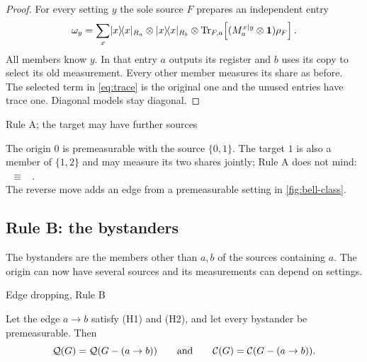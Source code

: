 \begin{proof}
For every setting $y$ the sole source $F$ prepares an independent entry
\[
 \omega_y=\sum_x\lvert x\rangle\!\langle x\rvert_{R_a}\otimes\lvert x\rangle\!\langle x\rvert_{R_b}\otimes
          \operatorname{Tr}_{F,a}\!\left[(M_a^{x\mid y}\otimes\mathbf{1})\rho_F\right].
\]
All members know $y$. In that entry $a$ outputs its register and $b$ uses its copy to select its
old measurement. Every other member measures its share as before. The selected term in \cref{eq:trace}
is the original one and the unused entries have trace one. Diagonal models stay diagonal.
\end{proof}

\begin{validbox}[label=ex:target-two]{Rule A; the target may have further sources}
\begin{minipage}{0.55\linewidth}
The origin $0$ is premeasurable with the source $\{0,1\}$. The target $1$ is also a member of $\{1,2\}$ and may
measure its two shares jointly; Rule A does not mind:\\[3pt]
 \ $\equiv$ \ .\\[3pt]
The reverse move adds an edge from a premeasurable setting in \cref{fig:bell-class}.
\end{minipage}\hfill
\begin{minipage}{0.42\linewidth}\centering
{}
\end{minipage}
\end{validbox}

\subsection{Rule B: the bystanders}
The bystanders are the members other than $a,b$ of the sources containing $a$. The origin can now
have several sources and its measurements can depend on settings.

\begin{rulebox}{Edge dropping, Rule B}
\begin{theorem}\label{thm:ruleB}
Let the edge $a\to b$ satisfy (H1) and (H2), and let every bystander be premeasurable. Then
\[\mathcal{Q}(G)=\mathcal{Q}(G-(a\to b))\qquad\text{and}\qquad\mathcal{C}(G)=\mathcal{C}(G-(a\to b)).\]
\end{theorem}
\end{rulebox}

